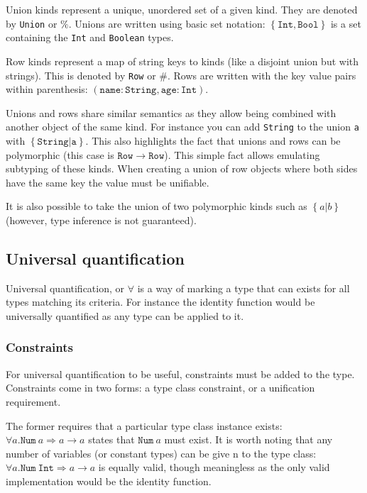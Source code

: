 Union kinds represent a unique, unordered set of a given kind. They are denoted by \texttt{Union} or $\%$. Unions are written using basic set notation: $\left \{  \mathtt{Int}, \mathtt{Bool} \right \}$ is a set containing the \texttt{Int} and \texttt{Boolean} types.

Row kinds represent a map of string keys to kinds (like a disjoint union but with strings). This is denoted by \texttt{Row} or $\#$. Rows are written with the key value pairs within parenthesis: $\left ( \mathtt{name : String}, \mathtt{age : Int} \right )$.

Unions and rows share similar semantics as they allow being combined with another object of the same kind. For instance you can add \texttt{String} to the union \texttt{a} with  $\left \{ \mathtt{String} | \mathtt{a} \right \}$. This also highlights the fact that unions and rows can be polymorphic (this case is $\mathtt{Row} \to \mathtt{Row}$). This simple fact allows emulating subtyping of these kinds. When creating a union of row objects where both sides have the same key the value must be unifiable.

It is also possible to take the union of two polymorphic kinds such as $\left \{ { a | b }\right \}$ (however, type inference is not guaranteed).

\subsection{Universal quantification}
Universal quantification, or $\forall$ is a way of marking a type that can exists for all types matching its criteria. For instance the identity function would be universally quantified as any type can be applied to it. 

\subsubsection{Constraints}
For universal quantification to be useful, constraints must be added to the type. Constraints come in two forms: a type class constraint, or a unification requirement. 

The former requires that a particular type class instance exists: $\forall a . \mathtt{Num}\ a \Rightarrow a \rightarrow a$ states that $\mathtt{Num}\ a$ must exist. It is worth noting that any number of variables (or constant types) can be give
n to the type class: $\forall a. \mathtt{Num\ Int} \Rightarrow a \rightarrow a$ is equally valid, though meaningless as the only valid implementation would be the identity function.

